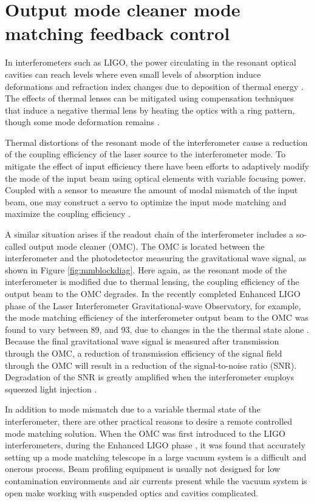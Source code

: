 \chapter{Output mode cleaner mode matching feedback control}
\label{ch:modematching}
In interferometers such as LIGO, the power circulating in the resonant optical cavities can reach levels where even small levels of absorption induce deformations and refraction index changes due to deposition of thermal energy \cite{absorptionheating}. %
The effects of thermal lenses can be mitigated using compensation techniques that induce a negative thermal lens by heating the optics with a ring pattern, though some mode deformation remains \cite{aLIGOTCS}. %


Thermal distortions of the resonant mode of the interferometer cause a reduction of the coupling efficiency of the laser source to the interferometer mode. %
To mitigate the effect of input efficiency there have been efforts to adaptively modify the mode of the input beam using optical elements with variable focusing power. %
Coupled with a sensor to measure the amount of modal mismatch of the input beam, one may construct a servo to optimize the input mode matching and maximize the coupling efficiency \cite{Arain:10,fan:104501,Mueller:00}.

A similar situation arises if the readout chain of the interferometer includes a so-called output mode cleaner (OMC). %
The OMC is located between the interferometer and the photodetector measuring the gravitational wave signal, as shown in Figure \ref{fig:mmblockdiag}. %
Here again, as the resonant mode of the interferometer is modified due to  thermal lensing, the coupling efficiency of the output beam to the OMC degrades. %
In the recently completed Enhanced LIGO phase of the Laser Interferometer Gravitational-wave Observatory, for example, the mode matching efficiency of the interferometer output beam to the OMC was found to vary between 89\perc{}, and 93\perc{}, due to changes in the the thermal state alone \cite{DooleyMMDoc}. %
Because the final gravitational wave signal is measured after transmission through the OMC, a reduction of transmission efficiency of the signal field through the OMC will result in a reduction of the signal-to-noise ratio (SNR). %
Degradation of the SNR is greatly amplified when the interferometer employs squeezed light injection \cite{GEOSqz:11}.

In addition to mode mismatch due to a variable thermal state of the interferometer, there are other practical reasons to desire a remote controlled mode matching solution. %
When the OMC was first introduced to the LIGO interferometers, during the Enhanced LIGO phase \cite{Tobin}, it was found that accurately setting up a mode matching telescope in a large vacuum system is a difficult and onerous process. %
Beam profiling equipment is usually not designed for low contamination environments and air currents present while the vacuum system is open make working with suspended optics and cavities complicated.

